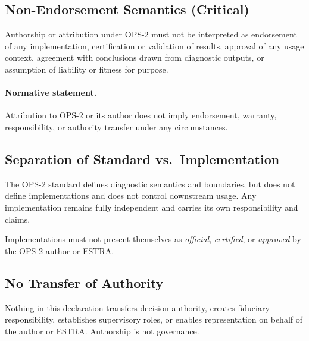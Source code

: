 \subsection{Non-Endorsement Semantics (Critical)}
Authorship or attribution under OPS-2 must not be interpreted as endorsement of any implementation, certification or validation of results, approval of any usage context, agreement with conclusions drawn from diagnostic outputs, or assumption of liability or fitness for purpose.

\paragraph{Normative statement.}
Attribution to OPS-2 or its author does not imply endorsement, warranty, responsibility, or authority transfer under any circumstances.

\subsection{Separation of Standard vs.\ Implementation}
The OPS-2 standard defines diagnostic semantics and boundaries, but does not define implementations and does not control downstream usage.
Any implementation remains fully independent and carries its own responsibility and claims.

Implementations must not present themselves as \emph{official}, \emph{certified}, or \emph{approved} by the OPS-2 author or ESTRA.

\subsection{No Transfer of Authority}
Nothing in this declaration transfers decision authority, creates fiduciary responsibility, establishes supervisory roles, or enables representation on behalf of the author or ESTRA.
Authorship is not governance.
